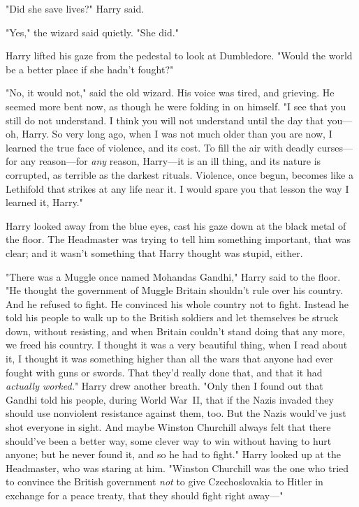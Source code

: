 "Did she save lives?" Harry said.

"Yes," the wizard said quietly. "She did."

Harry lifted his gaze from the pedestal to look at Dumbledore. "Would the world
be a better place if she hadn't fought?"

"No, it would not," said the old wizard. His voice was tired, and grieving. He
seemed more bent now, as though he were folding in on himself. "I see that you
still do not understand. I think you will not understand until the day that
you---oh, Harry. So very long ago, when I was not much older than you are now,
I learned the true face of violence, and its cost. To fill the air with deadly
curses---for any reason---for \emph{any} reason, Harry---it is an ill thing,
and its nature is corrupted, as terrible as the darkest rituals. Violence, once
begun, becomes like a Lethifold that strikes at any life near it. I{\el}
would spare you that lesson the way I learned it, Harry."

Harry looked away from the blue eyes, cast his gaze down at the black metal of
the floor. The Headmaster was trying to tell him something important, that was
clear; and it wasn't something that Harry thought was stupid, either.

"There was a Muggle once named Mohandas Gandhi," Harry said to the floor. "He
thought the government of Muggle Britain shouldn't rule over his country. And
he refused to fight. He convinced his whole country not to fight. Instead he
told his people to walk up to the British soldiers and let themselves be struck
down, without resisting, and when Britain couldn't stand doing that any more,
we freed his country. I thought it was a very beautiful thing, when I read
about it, I thought it was something higher than all the wars that anyone had
ever fought with guns or swords. That they'd really done that, and that it had
\emph{actually worked.}" Harry drew another breath. "Only then I found out that
Gandhi told his people, during World War~II, that if the Nazis invaded they
should use nonviolent resistance against them, too. But the Nazis would've just
shot everyone in sight. And maybe Winston Churchill always felt that there
should've been a better way, some clever way to win without having to hurt
anyone; but he never found it, and so he had to fight." Harry looked up at the
Headmaster, who was staring at him. "Winston Churchill was the one who tried to
convince the British government \emph{not} to give Czechoslovakia to Hitler in
exchange for a peace treaty, that they should fight right away---"

